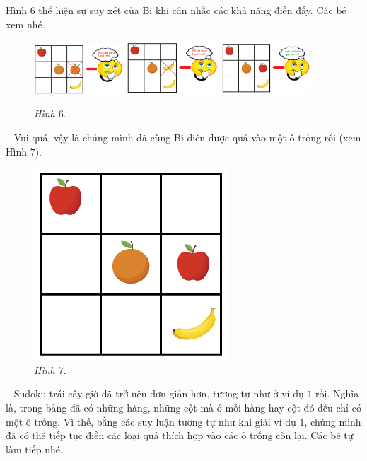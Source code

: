 	\vskip 0.1cm
	Hình $6$ thể hiện sự suy xét của Bi khi cân nhắc các khả năng điền đấy. Các bé xem nhé.
	\begin{figure}[H]
		\centering
		\vspace*{-5pt}
		\captionsetup{labelformat= empty, justification=centering}
		\includegraphics[width=0.3\textwidth]{hinh6a}\hfill
		\includegraphics[width=0.3\textwidth]{hinh6b}\hfill
		\includegraphics[width=0.3\textwidth]{hinh6c}
		\caption{\small\textit{Hình $6.$}}
		\vspace*{-10pt}
	\end{figure}
	\begin{multicols}{2}
	-- Vui quá, vậy là chúng mình đã cùng Bi điền được quả vào một ô trống rồi (xem Hình $7$).
		\begin{figure}[H]
		\vspace*{-5pt}
		\centering
		\captionsetup{labelformat=empty, justification=centering}
		\includegraphics[scale=0.4]{hinh7}
		\caption{\textit{\small Hình $7.$}}
		\vspace*{-5pt}
		\end{figure}
		-- Sudoku trái cây giờ đã trở nên đơn giản hơn, tương tự như ở ví dụ $1$ rồi. Nghĩa là, trong bảng đã có những hàng, những cột mà ở mỗi hàng hay cột đó đều chỉ có một ô trống. Vì thế, bằng các suy luận tương tự như khi giải ví dụ $1$, chúng mình đã có thể tiếp tục điền các loại quả thích hợp vào các ô trống còn lại. Các bé tự làm tiếp nhé.
	\end{multicols}

